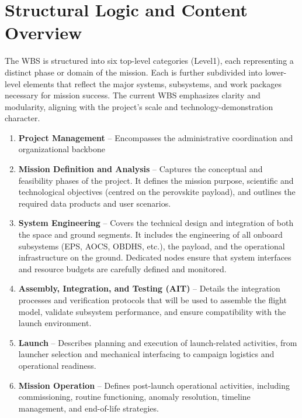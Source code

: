 \section{Structural Logic and Content Overview} 
The WBS is structured into six top-level categories (Level1), each representing a distinct phase or domain of the mission. Each is further subdivided into lower-level elements that reflect the major systems, subsystems, and work packages necessary for
mission success. The current WBS emphasizes clarity and modularity, aligning with the project's scale and technology-demonstration character.
\begin{enumerate}
    \item \textbf{Project Management} – Encompasses the administrative coordination and organizational backbone
    \item \textbf{Mission Definition and Analysis} – Captures the conceptual and feasibility phases of the project. It defines the mission purpose, scientific and technological objectives (centred on the perovskite payload), and outlines the required data products and user scenarios.
    \item \textbf{System Engineering} – Covers the technical design and integration of both the space and ground segments. It includes the engineering of all onboard subsystems (EPS, AOCS, OBDHS, etc.), the payload, and the operational infrastructure on the ground. Dedicated nodes ensure that system interfaces and resource budgets are carefully defined and monitored.
    \item \textbf{Assembly, Integration, and Testing (AIT)} – Details the integration processes and verification protocols that will be used to assemble the flight model, validate subsystem performance, and ensure compatibility with the launch environment.
    \item \textbf{Launch} – Describes planning and execution of launch-related activities, from launcher selection and mechanical interfacing to campaign logistics and operational readiness.
    \item \textbf{Mission Operation} – Defines post-launch operational activities, including commissioning, routine functioning, anomaly resolution, timeline management, and end-of-life strategies.
\end{enumerate}

